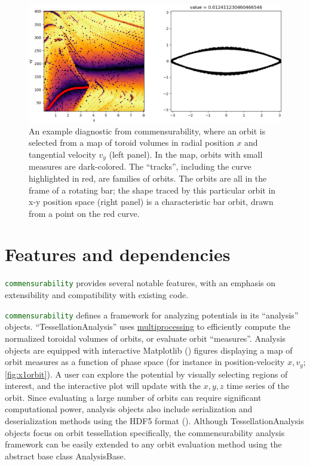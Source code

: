 \documentclass[12pt]{article}
\let\oldtexttt\texttt
\renewcommand{\texttt}[1]{\oldtexttt{\textcolor{darkgreen}{#1}}}
\begin{document}
\begin{figure}
\centering
\includegraphics{track_eye.png}
\caption{An example diagnostic from commensurability, where an orbit is
selected from a map of toroid volumes in radial position \(x\) and
tangential velocity \(v_y\) (left panel). In the map, orbits with small
measures are dark-colored. The ``tracks'', including the curve
highlighted in red, are families of orbits. The orbits are all in the
frame of a rotating bar; the shape traced by this particular orbit in
x-y position space (right panel) is a characteristic bar orbit, drawn
from a point on the red curve. \label{fig:x1orbit}}
\end{figure}

\section{Features and dependencies}\label{features-and-dependencies}

\texttt{commensurability} provides several notable features, with an
emphasis on extensibility and compatibility with existing code.

\texttt{commensurability} defines a framework for analyzing potentials
in its ``analysis'' objects. ``TessellationAnalysis'' uses
\href{https://docs.python.org/3/library/multiprocessing.html}{multiprocessing}
to efficiently compute the normalized toroidal volumes of orbits, or
evaluate orbit ``measures''. Analysis objects are equipped with
interactive Matplotlib ()
figures displaying a map of orbit measures as a function of phase space
(for instance in position-velocity \(x,v_y\); \autoref{fig:x1orbit}). A
user can explore the potential by visually selecting regions of
interest, and the interactive plot will update with the \(x,y,z\) time
series of the orbit. Since evaluating a large number of orbits can
require significant computational power, analysis objects also include
serialization and deserialization methods using the HDF5 format
(). Although
TessellationAnalysis objects focus on orbit tessellation specifically,
the commensurability analysis framework can be easily extended to any
orbit evaluation method using the abstract base class AnalysisBase.
\end{document}
